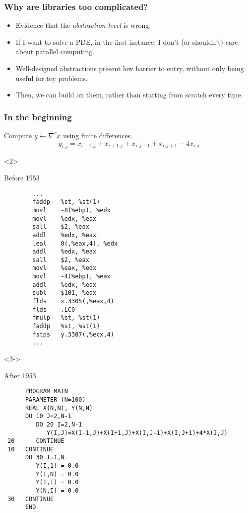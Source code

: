 \documentclass[presentation]{beamer}
\begin{document}
\begin{frame}
  \frametitle{Why are libraries too complicated?}
  \begin{itemize}
  \item Evidence that the \emph{abstraction level} is wrong.
  
  \item If I want to solve a PDE, in the first instance, I don't (or
    shouldn't) care about parallel computing.
  
  \item Well-designed abstractions present low barrier to entry, without
    only being useful for toy problems.

  \item Then, we can build on them, rather than starting from scratch
    every time.
  \end{itemize}
\end{frame}

\begin{frame}[fragile, t]
  \frametitle{In the beginning}
  Compute $y \leftarrow \nabla^2 x$ using finite differences.
  \begin{equation*}
    y_{i,j} = x_{i-1, j} + x_{i+1, j} + x_{i, j-1} + x_{i, j+1} - 4x_{i,j}    
  \end{equation*}

  \begin{onlyenv}<2>
    \begin{block}{Before 1953}
\begin{verbatim}
        ...
        faddp   %st, %st(1)
        movl    -8(%ebp), %edx
        movl    %edx, %eax
        sall    $2, %eax
        addl    %edx, %eax
        leal    0(,%eax,4), %edx
        addl    %edx, %eax
        sall    $2, %eax
        movl    %eax, %edx
        movl    -4(%ebp), %eax
        addl    %edx, %eax
        subl    $101, %eax
        flds    x.3305(,%eax,4)
        flds    .LC0
        fmulp   %st, %st(1)
        faddp   %st, %st(1)
        fstps   y.3307(,%ecx,4)
        ...
\end{verbatim}
    \end{block}
  \end{onlyenv}
  \begin{onlyenv}<3->
    \begin{block}{After 1953}
\begin{verbatim}
      PROGRAM MAIN
      PARAMETER (N=100)
      REAL X(N,N), Y(N,N)
      DO 10 J=2,N-1
         DO 20 I=2,N-1
            Y(I,J)=X(I-1,J)+X(I+1,J)+X(I,J-1)+X(I,J+1)+4*X(I,J)
 20      CONTINUE
 10   CONTINUE
      DO 30 I=1,N
         Y(I,1) = 0.0
         Y(I,N) = 0.0
         Y(1,I) = 0.0
         Y(N,I) = 0.0
 30   CONTINUE
      END
\end{verbatim}
    \end{block}
  \end{onlyenv}
\end{frame}
\end{document}
